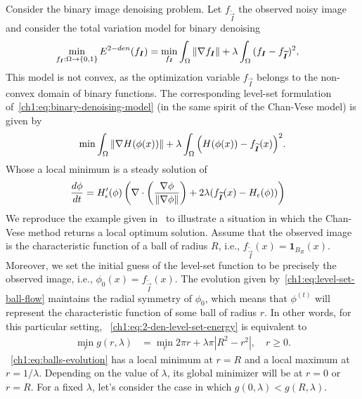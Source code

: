 Consider the binary image denoising problem. Let $f_{\widetilde{\vec{I}}}$ the observed noisy image and consider the total variation model for binary denoising
\begin{align}
	\min_{f_{\bm{I}}:\Omega \rightarrow \{0,1\} } E^{2-den}(f_{\bm{I}}) &= \min_{f_{\bm{I}}} \int_{\Omega}{\lVert\nabla f_{\bm{I}}\rVert} + \lambda \int_{\Omega}{ (f_{\bm{I}}-f_{\widetilde{\bm{I}}})^2}
	\label{ch1:eq:binary-denoising-model},
\end{align}
%
This model is not convex, as the optimization  variable $f_{\vec{I}}$ belongs to the non-convex domain of binary functions. The corresponding level-set formulation of~\cref{ch1:eq:binary-denoising-model} (in the same spirit of the Chan-Vese model) is given by
\begin{align}
	\min_{}{ \int_{\Omega}{ \lVert\nabla H(\phi(x))\rVert } + \lambda \int_{\Omega}{\left( H(\phi(x)) - f_{\widetilde{\bm{I}}}(x) \right)^2}}.
	\label{ch1:eq:2-den-level-set-energy}
\end{align}
%
Whose a local minimum is a steady solution of
\begin{align}
	\frac{d\phi}{dt} &= H_{\epsilon}^{\prime}(\phi)\left(  \nabla \cdot \left( \frac{ \nabla \phi}{\lVert\nabla \phi\rVert}\right) + 2\lambda(f_{\widetilde{\bm{I}}}(x) - H_{\epsilon}(\phi)) \right)
	\label{ch1:eq:level-set-ball-flow}
\end{align}
%
We reproduce the example given in~\cite{chan06} to illustrate a situation in which the Chan-Vese method returns a local optimum solution. Assume that the observed image is the characteristic function of a ball of radius $R$, i.e., $f_{\widetilde{\vec{I}}}(x) = \mathbf{1}_{B_R}(x)$. Moreover, we set the initial guess of the level-set function to be precisely the observed image, i.e., $\phi_0(x) = f_{\widetilde{\vec{I}}}(x)$. The evolution given by~\cref{ch1:eq:level-set-ball-flow} maintains the radial symmetry of $\phi_0$, which means that $\phi^{(t)}$ will represent the characteristic function of some ball of radius $r$. In other words, for this particular setting, ~\cref{ch1:eq:2-den-level-set-energy} is equivalent to
\begin{align}
	\min_{r} g(r,\lambda) &= \min_r 2\pi r + \lambda \pi |R^2-r^2|, \quad r \geq 0.
	\label{ch1:eq:balls-evolution}
\end{align}
%
%
~\cref{ch1:eq:balls-evolution} has a local minimum at $r=R$ and a local maximum at $r=1/\lambda$. Depending on the value of $\lambda$, its global minimizer will be at $r=0$ or $r=R$. For a fixed $\lambda$, let's consider the case in which $g(0,\lambda) < g(R,\lambda)$.
